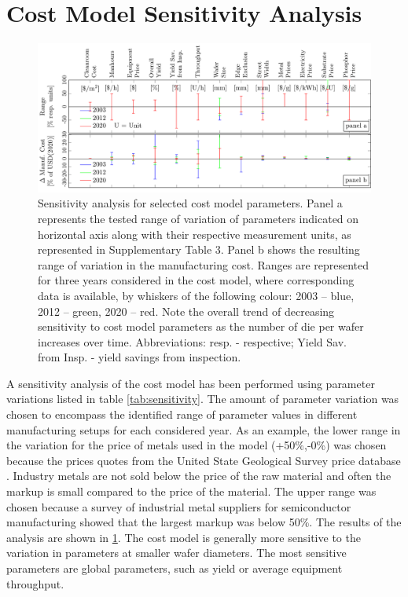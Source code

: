 \documentclass[parskip=full]{article}
\begin{document}
\newpage
\section{Cost Model Sensitivity Analysis}

\begin{figure}[ht!]
	\centering
    \includegraphics[width=\textwidth]{./figures/costmodel_sensitivity.pdf}
	\caption{Sensitivity analysis for selected cost model parameters. Panel a represents the tested range of variation of parameters indicated on horizontal axis along with their respective measurement units, as represented in Supplementary Table 3. Panel b shows the resulting range of variation in the manufacturing cost. Ranges are represented for three years considered in the cost model, where corresponding data is available, by whiskers of the following colour: 2003 – blue, 2012 – green, 2020 – red. Note the overall trend of decreasing sensitivity to cost model parameters as the number of die per wafer increases over time. Abbreviations: resp. - respective; Yield Sav. from Insp. - yield savings from inspection.}
	\label{fig:sensitivity}
\end{figure}

A sensitivity analysis of the cost model has been performed using parameter variations listed in table \cref{tab:sensitivity}. The amount of parameter variation was chosen to encompass the identified range of parameter values in different manufacturing setups for each considered year. As an example, the lower range in the variation for the price of metals used in the model (+50\%,-0\%) was chosen because the prices quotes from the United State Geological Survey price database \cite{usgeoprices}. Industry metals are not sold below the price of the raw material and often the markup is small compared to the price of the material. The upper range was chosen because a survey of industrial metal suppliers for semiconductor manufacturing showed that the largest markup was below 50\%. The results of the analysis are shown in  \cref{fig:sensitivity}. The cost model is generally more sensitive to the variation in parameters at smaller wafer diameters. The most sensitive parameters are global parameters, such as yield or average equipment throughput.
\end{document}
